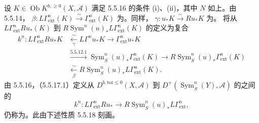 设 $K\in\operatorname{Ob}K^{b,\geq0}(X,\mathscr A)$ 满足 5.5.16 的条件 (i)、(ii)，其中 $N$ 如上。由 5.5.14， $\beta:L\Gamma^n_{\mathrm{ext}}(K)\xrightarrow\sim\Gamma^n_{\mathrm{ext}}(K)$ 为。同样， $\gamma:u_*K\xrightarrow\sim Ru_*K$ 为。
将从 $L\Gamma^n_{\mathrm{ext}}Ru_*(K)$ 到 $R\operatorname{Sym}^n(u)_*L\Gamma^n_{\mathrm{ext}}(K)$ 的定义为复合
\begin{equation}\tag{5.5.17.1}\begin{aligned}
k^n:L\Gamma^n_{\mathrm{ext}}Ru_*K&\xleftarrow[\gamma]{\sim}L\Gamma^n u_*K\longrightarrow\Gamma^n_{\mathrm{ext}}u_*K\\
&\xrightarrow{5.5.12.1}\operatorname{Sym}^n_S(u)_*\Gamma^n_{\mathrm{ext}}(K)\longrightarrow R\operatorname{Sym}^n_S(u)_*\Gamma^n_{\mathrm{ext}}(K)\\
&\xleftarrow[\beta]{\sim}R\operatorname{Sym}^n_S(u)_*L\Gamma^n_{\mathrm{ext}}(K).
\end{aligned}\end{equation}
由 5.5.16，（5.5.17.1）定义从 $D^{b,\mathrm{tor}\leq0}(X,\mathscr A)$ 到 $D^+(\operatorname{Sym}^n_S(Y),\mathscr A)$ 的之间的
\begin{equation}\tag{5.5.17.2}k^n:L\Gamma^n_{\mathrm{ext}}Ru_*\longrightarrow R\operatorname{Sym}^n_S(u)_*L\Gamma^n_{\mathrm{ext}},\end{equation}
仍称为。此由下述性质 5.5.18 刻画。

